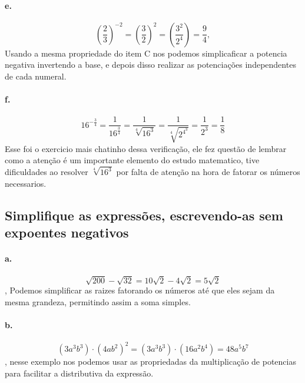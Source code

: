 \documentclass{article}
\begin{document}
	\paragraph{e.}
	\begin{equation}
	\left(\frac{2}{3}\right)^{-2} = \left(\frac{3}{2}\right)^{2} = \left(\frac{3^2}{2^4}\right) = \frac{9}{4},
	\end{equation}
	Usando a mesma propriedade do item C nos podemos simplicaficar a potencia negativa invertendo a base, e depois disso realizar as potenciações independentes de cada numeral.

	\paragraph{f.}
	\begin{equation}
	16^{-\frac{3}{4}} = \frac{1}{16^{\frac{3}{4}}} = \frac{1}{\sqrt[4]{16^3}} = \frac{1}{\sqrt[4]{2^{4^{3}}}} = \frac{1}{2^3} = \frac{1}{8} 
	\end{equation}
	Esse foi o exercicio mais chatinho dessa verificação, ele fez questão de lembrar como a atenção é um importante elemento do estudo matematico, tive dificuldades ao resolver $\sqrt[4]{16^3}$ por falta de atenção na hora de fatorar os números necessarios.

\subsection{Simplifique as expressões, escrevendo-as sem expoentes negativos}

	\paragraph{a.}
	\begin{equation}
	\sqrt{200} - \sqrt{32} = 10\sqrt{2} - 4\sqrt{2} = 5\sqrt{2}
	\end{equation},
	Podemos simplificar as raizes fatorando os números até que eles sejam da mesma grandeza, permitindo assim a soma simples.

	\paragraph{b.}
	\begin{equation}
	(3a^3b^3)\cdot(4ab^2)^2 = (3a^3b^3)\cdot(16a^2b^4)= 48a^5b^7
	\end{equation},
	nesse exemplo nos podemos usar as propriedadas da multiplicação de potencias para facilitar a distributiva da expressão.
	
\end{document}
